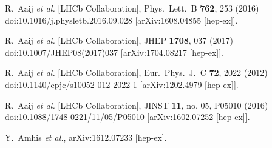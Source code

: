 \documentclass[10pt]{article}
\begin{document}
\begin{thebibliography}{99}
  R.~Aaij {\it et al.} [LHCb Collaboration],
  Phys.\ Lett.\ B {\bf 762}, 253 (2016)
  doi:10.1016/j.physletb.2016.09.028
  [arXiv:1608.04855 [hep-ex]].



  R.~Aaij {\it et al.} [LHCb Collaboration],
  JHEP {\bf 1708}, 037 (2017)
  doi:10.1007/JHEP08(2017)037
  [arXiv:1704.08217 [hep-ex]].



  R.~Aaij {\it et al.} [LHCb Collaboration],
  Eur.\ Phys.\ J.\ C {\bf 72}, 2022 (2012)
  doi:10.1140/epjc/s10052-012-2022-1
  [arXiv:1202.4979 [hep-ex]].



  R.~Aaij {\it et al.} [LHCb Collaboration],
  JINST {\bf 11}, no. 05, P05010 (2016)
  doi:10.1088/1748-0221/11/05/P05010
  [arXiv:1602.07252 [hep-ex]].



  Y.~Amhis {\it et al.},
  arXiv:1612.07233 [hep-ex].




\end{thebibliography}




\end{document}
